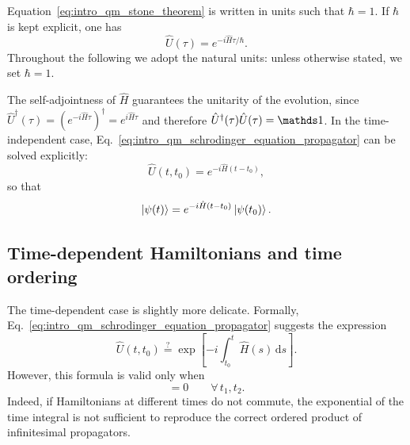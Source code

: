 Equation~\eqref{eq:intro_qm_stone_theorem} is written in units such that $\hbar=1$. If $\hbar$ is kept explicit, one has
\begin{equation}
	\hat U(\tau)=e^{-i\hat H\tau/\hbar}.
	\label{eq:intro_qm_stone_theorem_with_hbar}
\end{equation}
Throughout the following we adopt the natural units: unless otherwise stated, we set $\hbar=1$.

The self-adjointness of $\hat H$ guarantees the unitarity of the evolution, since $\hat U^\dagger(\tau)=\left(e^{-i\hat H\tau}\right)^\dagger=e^{i\hat H\tau}$ and therefore $\hat U^\dagger(\tau)\hat U(\tau)=\id$. In the time-independent case, Eq.~\eqref{eq:intro_qm_schrodinger_equation_propagator} can be solved explicitly:
\begin{equation}
	\hat U(t,t_0)=e^{-i\hat H(t-t_0)},
	\label{eq:intro_qm_time_independent_propagator_exponential}
\end{equation}
so that
\begin{equation}
	\ket{\psi(t)}=e^{-i\hat H(t-t_0)}\ket{\psi(t_0)}.
	\label{eq:intro_qm_state_evolution_time_independent_hamiltonian}
\end{equation}

\subsection{Time-dependent Hamiltonians and time ordering}

The time-dependent case is slightly more delicate. Formally, Eq.~\eqref{eq:intro_qm_schrodinger_equation_propagator} suggests the expression
\begin{equation}
	\hat U(t,t_0)\overset{?}{=}\exp\left[-i\int_{t_0}^{t}\hat H(s)\,\mathrm{d}s\right].
	\label{eq:intro_qm_naive_time_dependent_propagator}
\end{equation}
However, this formula is valid only when
\begin{equation}
	[\hat H(t_1),\hat H(t_2)]=0
	\qquad
	\forall\, t_1,t_2.
	\label{eq:intro_qm_commuting_time_dependent_hamiltonian}
\end{equation}
Indeed, if Hamiltonians at different times do not commute, the exponential of the time integral is not sufficient to reproduce the correct ordered product of infinitesimal propagators.

